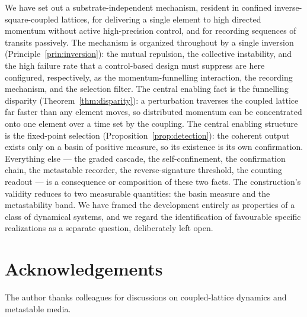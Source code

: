 \documentclass[twocolumn,10pt,a4paper]{article}
\theoremstyle{thmstyle}
\theoremstyle{definition}
\theoremstyle{remark}
\begin{document}
We have set out a substrate-independent mechanism, resident in confined
inverse-square-coupled lattices, for delivering a single element to high
directed momentum without active high-precision control, and for recording
sequences of transits passively. The mechanism is organized throughout by a
single inversion (Principle~\ref{prin:inversion}): the mutual repulsion, the
collective instability, and the high failure rate that a control-based design
must suppress are here configured, respectively, as the momentum-funnelling
interaction, the recording mechanism, and the selection filter. The central
enabling fact is the funnelling disparity (Theorem~\ref{thm:disparity}): a
perturbation traverses the coupled lattice far faster than any element moves,
so distributed momentum can be concentrated onto one element over a time set
by the coupling. The central enabling structure is the fixed-point selection
(Proposition~\ref{prop:detection}): the coherent output exists only on a basin
of positive measure, so its existence is its own confirmation. Everything
else --- the graded cascade, the self-confinement, the confirmation chain, the
metastable recorder, the reverse-signature threshold, the counting readout ---
is a consequence or composition of these two facts. The construction's
validity reduces to two measurable quantities: the basin measure and the
metastability band. We have framed the development entirely as properties of a
class of dynamical systems, and we regard the identification of favourable
specific realizations as a separate question, deliberately left open.

\section*{Acknowledgements}
The author thanks colleagues for discussions on coupled-lattice dynamics and
metastable media.



\end{document}
